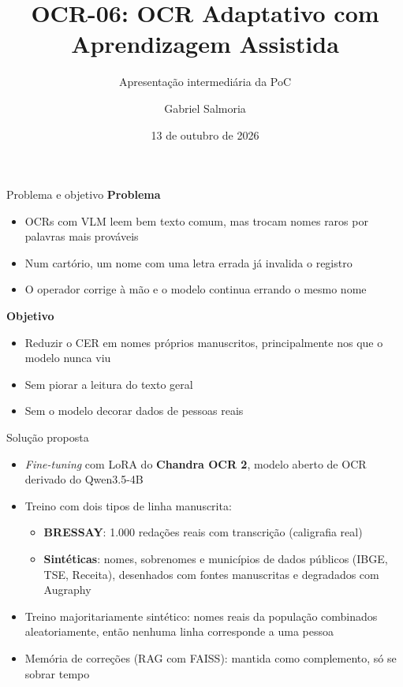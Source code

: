 \documentclass[aspectratio=169,11pt]{beamer}
\title{OCR-06: OCR Adaptativo com Aprendizagem Assistida}
\subtitle{Apresentação intermediária da PoC}
\author{Gabriel Salmoria \quad {\small Tutor: Lucas Mayr}}
\institute{INE5448 -- IA e Segurança -- UFSC}
\date{13 de outubro de 2026}
\begin{document}
\maketitle

\begin{frame}{Problema e objetivo}
\textbf{Problema}
\begin{itemize}
  \item OCRs com VLM leem bem texto comum, mas trocam nomes raros por palavras mais prováveis
  \item Num cartório, um nome com uma letra errada já invalida o registro
  \item O operador corrige à mão e o modelo continua errando o mesmo nome
\end{itemize}
\vspace{0.6em}
\textbf{Objetivo}
\begin{itemize}
  \item Reduzir o CER em nomes próprios manuscritos, principalmente nos que o modelo nunca viu
  \item Sem piorar a leitura do texto geral
  \item Sem o modelo decorar dados de pessoas reais
\end{itemize}
\end{frame}

\begin{frame}{Solução proposta}
\begin{itemize}
  \item \emph{Fine-tuning} com LoRA do \textbf{Chandra OCR 2}, modelo aberto de OCR derivado do Qwen3.5-4B
  \item Treino com dois tipos de linha manuscrita:
  \begin{itemize}
    \item \textbf{BRESSAY}: 1.000 redações reais com transcrição (caligrafia real)
    \item \textbf{Sintéticas}: nomes, sobrenomes e municípios de dados públicos (IBGE, TSE, Receita), desenhados com fontes manuscritas e degradados com Augraphy
  \end{itemize}
  \item Treino majoritariamente sintético: nomes reais da população combinados aleatoriamente, então nenhuma linha corresponde a uma pessoa
  \item Memória de correções (RAG com FAISS): mantida como complemento, só se sobrar tempo
\end{itemize}
\end{frame}
\end{document}
